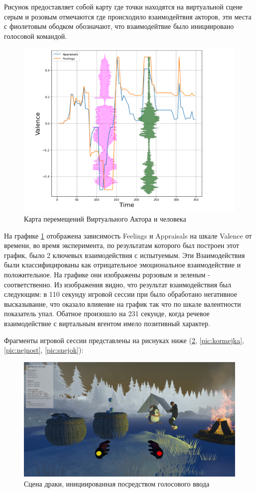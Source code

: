 Рисунок предоставляет собой карту где точки находятся на виртуальной сцене 
серым и розовым отмечаются где происходило взаимодейтвия акторов, эти 
места с фиолетовым ободком обозначают, что взаимодейтвие было инициировано
голосовой командой.

\begin{figure}[h]
\includegraphics[width=0.75\columnwidth]{./img/GRAFIK.png}
\centering
\caption{Карта перемещений Виртуального Актора и человека}
\label{pic:grafik_res}
\end{figure}

На графике \ref{pic:grafik_res} отображена зависимость Feelings и Appraisals
на шкале Valence от времени, во время эксперимента, по результатам которого 
был построен этот график, было 2 ключевых взаимодействия с испытуемым. Эти
Взаимодействия были классифицированы как отрицательное эмоциональное взаимодействие и положительное.
На графике они изображены рорзовым и зеленым - соответственно.
Из изображения видно, что результат взаимодействия был следующим:
в 110 секунду игровой сессии при было обработано негативное высказывание, что 
оказало влияение на график так что по шкале валентности показатель упал.
Обатное произошло на 231 секунде, когда речевое взаимодействие с виртальным 
вгентом имело позитивный характер.

Фрагменты игровой сессии представлены на риснуках ниже (\ref{pic:draka}, \ref{pic:kormejka}, \ref{pic:nejnost}, \ref{pic:snejok}):

\begin{figure}[h]
\includegraphics[width=0.75\columnwidth]{./img/peni/draka_obosraka.jpg}
\centering
\caption{Сцена драки, инициированная посредством голосового ввода}
\label{pic:draka}
\end{figure}

